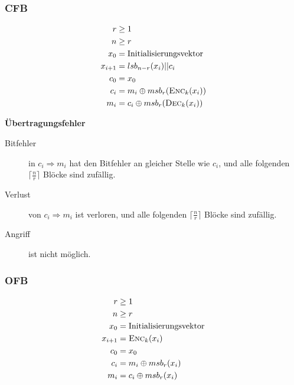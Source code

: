 \documentclass[a4paper,landscape]{article}
\newcommand{\plaint}{\ensuremath{m}}
\newcommand{\ciphert}{\ensuremath{c}}
\newcommand{\enc}{\textsc{Enc}}
\newcommand{\dec}{\textsc{Dec}}
\begin{document}
\begin{multicols*}{4}
	\subsubsection{CFB}
	\begin{align*}
		r            & \geq 1                                         \\
		n            & \geq r                                         \\
		x_{0}        & = \text{Initialisierungsvektor}                \\
		x_{i+1}      & = lsb_{n-r}(x_{i}) || \ciphert_{i}             \\
		\ciphert_{0} & = x_{0}                                        \\
		\ciphert_{i} & = \plaint_{i} \oplus msb_{r}(\enc_{k}(x_{i}))  \\
		\plaint_{i}  & = \ciphert_{i} \oplus msb_{r}(\dec_{k}(x_{i}))
	\end{align*}

	\textbf{Übertragungsfehler}
	\begin{description}
		\item[Bitfehler] in \(\ciphert_{i} \Rightarrow \plaint_{i}\) hat den
		      Bitfehler an gleicher Stelle wie \(\ciphert_{i}\), und alle folgenden
		      \(\lceil\frac{n}{r}\rceil\) Blöcke sind zufällig.
		\item[Verlust] von \(\ciphert_{i} \Rightarrow \plaint_{i}\) ist verloren,
		      und alle folgenden \(\lceil\frac{n}{r}\rceil\) Blöcke sind zufällig.
		\item[Angriff] ist nicht möglich.
	\end{description}

	\subsubsection{OFB}
	\begin{align*}
		r            & \geq 1                               \\
		n            & \geq r                               \\
		x_{0}        & = \text{Initialisierungsvektor}      \\
		x_{i+1}      & = \enc_{k}(x_{i})                    \\
		\ciphert_{0} & = x_{0}                              \\
		\ciphert_{i} & = \plaint_{i} \oplus msb_{r}(x_{i})  \\
		\plaint_{i}  & = \ciphert_{i} \oplus msb_{r}(x_{i})
	\end{align*}


\end{multicols*}
\end{document}

